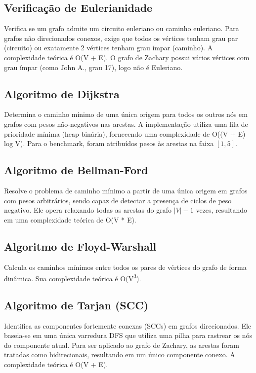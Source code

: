 \documentclass[sigconf,nonacm]{webmedia}
\begin{document}
\subsection{Verificação de Eulerianidade}
Verifica se um grafo admite um circuito euleriano ou caminho euleriano. Para grafos não direcionados conexos, exige que todos os vértices tenham grau par (circuito) ou exatamente 2 vértices tenham grau ímpar (caminho). A complexidade teórica é O(V + E).
O grafo de Zachary possui vários vértices com grau ímpar (como John A., grau 17), logo não é Euleriano.

\subsection{Algoritmo de Dijkstra}
Determina o caminho mínimo de uma única origem para todos os outros nós em grafos com pesos não-negativos nas arestas. A implementação utiliza uma fila de prioridade mínima (heap binária), fornecendo uma complexidade de O((V + E) log V). Para o benchmark, foram atribuídos pesos às arestas na faixa $[1, 5]$.

\subsection{Algoritmo de Bellman-Ford}
Resolve o problema de caminho mínimo a partir de uma única origem em grafos com pesos arbitrários, sendo capaz de detectar a presença de ciclos de peso negativo. Ele opera relaxando todas as arestas do grafo $|V| - 1$ vezes, resultando em uma complexidade teórica de O(V * E).

\subsection{Algoritmo de Floyd-Warshall}
Calcula os caminhos mínimos entre todos os pares de vértices do grafo de forma dinâmica. Sua complexidade teórica é O(V\textsuperscript{3}).

\subsection{Algoritmo de Tarjan (SCC)}
Identifica as componentes fortemente conexas (SCCs) em grafos direcionados. Ele baseia-se em uma única varredura DFS que utiliza uma pilha para rastrear os nós do componente atual. Para ser aplicado ao grafo de Zachary, as arestas foram tratadas como bidirecionais, resultando em um único componente conexo. A complexidade teórica é O(V + E).
\end{document}
